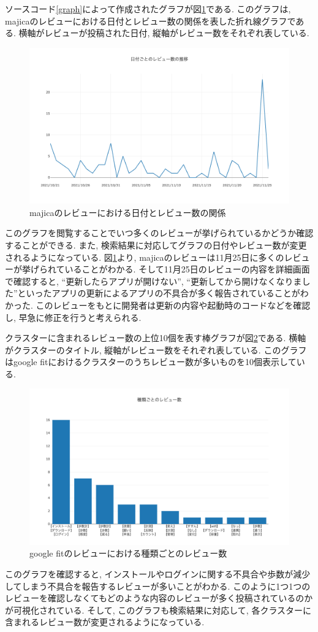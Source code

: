 ソースコード\ref{graph}によって作成されたグラフが図\ref{fig:majica_graph}である. このグラフは, majicaのレビューにおける日付とレビュー数の関係を表した折れ線グラフである. 
横軸がレビューが投稿された日付, 縦軸がレビュー数をそれぞれ表している. 

\begin{figure}[H]
  \centering
  \includegraphics[scale=0.4]
    {contents/images/majica_graph.png}
  \caption{majicaのレビューにおける日付とレビュー数の関係\label{fig:majica_graph}}
\end{figure}

このグラフを閲覧することでいつ多くのレビューが挙げられているかどうか確認することができる. また, 検索結果に対応してグラフの日付やレビュー数が変更されるようになっている. 
図\ref{fig:majica_graph}より, majicaのレビューは11月25日に多くのレビューが挙げられていることがわかる. そして11月25日のレビューの内容を詳細画面で確認すると, ``更新したらアプリが開けない'', ``更新してから開けなくなりました''といったアプリの更新によるアプリの不具合が多く報告されていることがわかった. 
このレビューをもとに開発者は更新の内容や起動時のコードなどを確認し, 早急に修正を行うと考えられる. 

クラスターに含まれるレビュー数の上位10個を表す棒グラフが図\ref{fig:top10}である. 横軸がクラスターのタイトル, 縦軸がレビュー数をそれぞれ表している. 
このグラフはgoogle fitにおけるクラスターのうちレビュー数が多いものを10個表示している. 

\begin{figure}[H]
  \centering
  \includegraphics[scale=0.4]
    {contents/images/top10.png}
  \caption{google fitのレビューにおける種類ごとのレビュー数\label{fig:top10}}
\end{figure}

このグラフを確認すると, インストールやログインに関する不具合や歩数が減少してしまう不具合を報告するレビューが多いことがわかる. このように1つ1つのレビューを確認しなくてもどのような内容のレビューが多く投稿されているのかが可視化されている. 
そして, このグラフも検索結果に対応して, 各クラスターに含まれるレビュー数が変更されるようになっている. 
